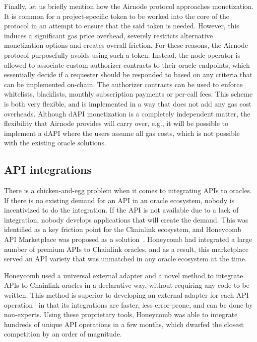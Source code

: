 \documentclass[11pt]{article}
\begin{document}
Finally, let us briefly mention how the Airnode protocol approaches monetization.
It is common for a project-specific token to be worked into the core of the protocol in an attempt to ensure that the said token is needed.
However, this induces a significant gas price overhead, severely restricts alternative monetization options and creates overall friction.
For these reasons, the Airnode protocol purposefully avoids using such a token.
Instead, the node operator is allowed to associate custom authorizer contracts to their oracle endpoints, which essentially decide if a requester should be responded to based on any criteria that can be implemented on-chain.
The authorizer contracts can be used to enforce whitelists, blacklists, monthly subscription payments or per-call fees.
This scheme is both very flexible, and is implemented in a way that does not add any gas cost overheads.
Although dAPI monetization is a completely independent matter, the flexibility that Airnode provides will carry over, e.g., it will be possible to implement a dAPI where the users assume all gas costs, which is not possible with the existing oracle solutions.

\subsection{API integrations}
\label{sec:api-integrations}

There is a chicken-and-egg problem when it comes to integrating APIs to oracles.
If there is no existing demand for an API in an oracle ecosystem, nobody is incentivized to do the integration.
If the API is not available due to a lack of integration, nobody develops applications that will create the demand.
This was identified as a key friction point for the Chainlink ecosystem, and Honeycomb API Marketplace was proposed as a solution~\cite{benligiray:2019}.
Honeycomb had integrated a large number of premium APIs to Chainlink oracles, and as a result, this marketplace served an API variety that was unmatched in any oracle ecosystem at the time.

Honeycomb used a universal external adapter and a novel method to integrate APIs to Chainlink oracles in a declarative way, without requiring any code to be written.
This method is superior to developing an external adapter for each API operation~\cite{external-adapters} in that its integrations are faster, less error-prone, and can be done by non-experts.
Using these proprietary tools, Honeycomb was able to integrate hundreds of unique API operations in a few months, which dwarfed the closest competition by an order of magnitude.
\end{document}
